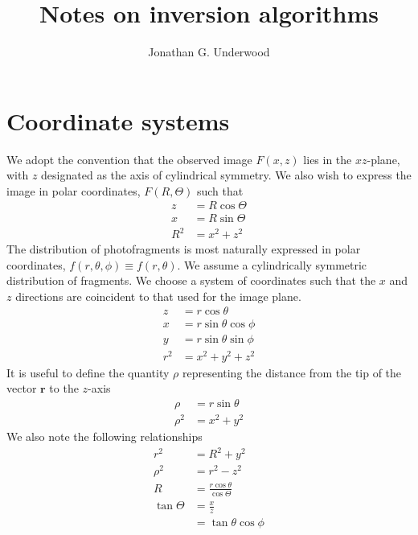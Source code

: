 \documentclass{article}
\title{Notes on inversion algorithms}
\author {Jonathan G. Underwood}
\begin{document}
\maketitle
\tableofcontents

\section{Coordinate systems}
We adopt the convention that the observed image $F(x,z)$ lies in the
$xz$-plane, with $z$ designated as the axis of cylindrical symmetry. We also
wish to express the image in polar coordinates, $F(R, \Theta)$ such that
\begin{subequations}
  \begin{align}
    z&=R\cos\Theta\\
    x&=R\sin\Theta\\
    R^2&=x^2+z^2
  \end{align}
\end{subequations}
The distribution of photofragments is most naturally expressed in polar
coordinates, $f(r, \theta, \phi)\equiv f(r, \theta)$. We assume a
cylindrically symmetric distribution of fragments. We choose a system of
coordinates such that the $x$ and $z$ directions are coincident to that used
for the image plane.
\begin{subequations}
  \begin{align}
    z&=r\cos\theta\\
    x&=r\sin\theta\cos\phi\\
    y&=r\sin\theta\sin\phi\\
    r^2&=x^2+y^2+z^2
  \end{align}
\end{subequations}
It is useful to define the quantity $\rho$ representing the distance from the
tip of the vector $\mathbf{r}$ to the $z$-axis
\begin{subequations}
  \begin{align}
    \rho&=r\sin\theta\\
    \rho^2&=x^2+y^2
  \end{align}
\end{subequations}
We also note the following relationships
\begin{subequations}
  \begin{align}
    r^2&=R^2+y^2\\
    \rho^2&=r^2-z^2\\
    R&=\frac{r\cos\theta}{\cos\Theta}\\
    \tan\Theta&=\frac{x}{z}\\&=\tan\theta\cos\phi
  \end{align}
\end{subequations}
\end{document}
